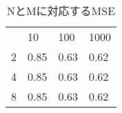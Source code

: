 \begin{table}[t]
  \begin{center}
      \caption{NとMに対応するMSE}
    \label{table1}
\begin{tabular}{llll}
  & 10   & 100  & 1000 \\
2 & 0.85 & 0.63 & 0.62 \\
4 & 0.85 & 0.63 & 0.62 \\
8 & 0.85 & 0.63 & 0.62
\end{tabular}
\end{center}
\end{table}